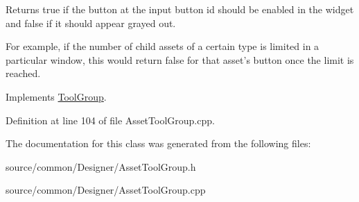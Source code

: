 Returns true if the button at the input button id should be enabled in the widget and false if it should appear grayed out. 

For example, if the number of child assets of a certain type is limited in a particular window, this would return false for that asset's button once the limit is reached. 

Implements \hyperlink{class_tool_group_adf3e25748f41ba5490aac857e375260d}{Tool\-Group}.



Definition at line 104 of file Asset\-Tool\-Group.\-cpp.



The documentation for this class was generated from the following files\-:\begin{DoxyCompactItemize}
\item 
source/common/\-Designer/Asset\-Tool\-Group.\-h\item 
source/common/\-Designer/Asset\-Tool\-Group.\-cpp\end{DoxyCompactItemize}
